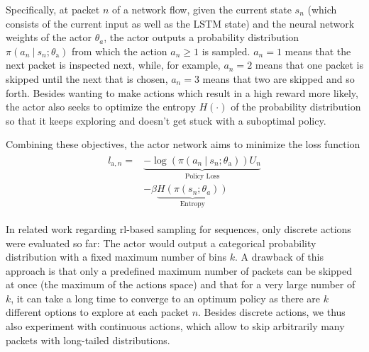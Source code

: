 \documentclass[conference]{IEEEtran}
\newcommand\givenbase[1][]{\:#1\lvert\:}
\let\given\givenbase
\begin{document}
Specifically, at packet $n$ of a network flow, given the current state $s_n$ (which consists of the current input as well as the LSTM state) and the neural network weights of the actor $\theta_a$, the actor outputs a probability distribution $\pi \left( a_n \given s_n ; \theta_\text{a} \right)$ from which the action $a_n \ge 1$ is sampled. $a_n=1$ means that the next packet is inspected next, while, for example, $a_n=2$ means that one packet is skipped until the next that is chosen, $a_n = 3$ means that two are skipped and so forth. Besides wanting to make actions which result in a high reward more likely, the actor also seeks to optimize the entropy $H(\cdot)$ of the probability distribution so that it keeps exploring and doesn't get stuck with a suboptimal policy.

Combining these objectives, the actor network aims to minimize the loss function
\begin{align}
\begin{split}
l_{\text{a},n} =& \underbrace{ -\log \left( \pi \left( a_n \given s_n ; \theta_\text{a} \right) \right) U_n}_{\text{Policy Loss}} \\
&- \beta \underbrace{H\left( \pi\left( s_n; \theta_a \right)\right) }_{\text{Entropy}}
\end{split}\label{eq:actor}
\end{align}


In related work regarding \gls{rl}-based sampling for sequences, only discrete actions were evaluated so far: The actor would output a categorical probability distribution with a fixed maximum number of bins $k$. A drawback of this approach is that only a predefined maximum number of packets can be skipped at once (the maximum of the actions space) and that for a very large number of $k$, it can take a long time to converge to an optimum policy as there are $k$ different options to explore at each packet $n$. Besides discrete actions, we thus also experiment with continuous actions, which allow to skip arbitrarily many packets with long-tailed distributions.
\end{document}
